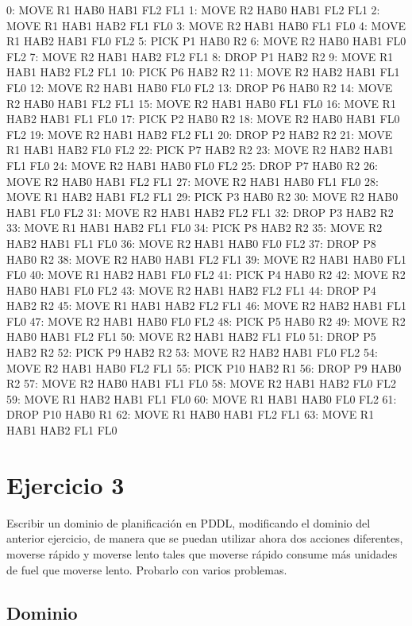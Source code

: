 \documentclass[	DIV=calc,%
							paper=a4,%
							fontsize=11pt]{scrartcl}	 					%
\newcommand{\miit}[1]{{\usefont{T1}{mdugm}{m}{it}\selectfont #1}}
\begin{document}
\begin{bashcode}
0: MOVE R1 HAB0 HAB1 FL2 FL1
1: MOVE R2 HAB0 HAB1 FL2 FL1
2: MOVE R1 HAB1 HAB2 FL1 FL0
3: MOVE R2 HAB1 HAB0 FL1 FL0
4: MOVE R1 HAB2 HAB1 FL0 FL2
5: PICK P1 HAB0 R2
6: MOVE R2 HAB0 HAB1 FL0 FL2
7: MOVE R2 HAB1 HAB2 FL2 FL1
8: DROP P1 HAB2 R2
9: MOVE R1 HAB1 HAB2 FL2 FL1
10: PICK P6 HAB2 R2
11: MOVE R2 HAB2 HAB1 FL1 FL0
12: MOVE R2 HAB1 HAB0 FL0 FL2
13: DROP P6 HAB0 R2
14: MOVE R2 HAB0 HAB1 FL2 FL1
15: MOVE R2 HAB1 HAB0 FL1 FL0
16: MOVE R1 HAB2 HAB1 FL1 FL0
17: PICK P2 HAB0 R2
18: MOVE R2 HAB0 HAB1 FL0 FL2
19: MOVE R2 HAB1 HAB2 FL2 FL1
20: DROP P2 HAB2 R2
21: MOVE R1 HAB1 HAB2 FL0 FL2
22: PICK P7 HAB2 R2
23: MOVE R2 HAB2 HAB1 FL1 FL0
24: MOVE R2 HAB1 HAB0 FL0 FL2
25: DROP P7 HAB0 R2
26: MOVE R2 HAB0 HAB1 FL2 FL1
27: MOVE R2 HAB1 HAB0 FL1 FL0
28: MOVE R1 HAB2 HAB1 FL2 FL1
29: PICK P3 HAB0 R2
30: MOVE R2 HAB0 HAB1 FL0 FL2
31: MOVE R2 HAB1 HAB2 FL2 FL1
32: DROP P3 HAB2 R2
33: MOVE R1 HAB1 HAB2 FL1 FL0
34: PICK P8 HAB2 R2
35: MOVE R2 HAB2 HAB1 FL1 FL0
36: MOVE R2 HAB1 HAB0 FL0 FL2
37: DROP P8 HAB0 R2
38: MOVE R2 HAB0 HAB1 FL2 FL1
39: MOVE R2 HAB1 HAB0 FL1 FL0
40: MOVE R1 HAB2 HAB1 FL0 FL2
41: PICK P4 HAB0 R2
42: MOVE R2 HAB0 HAB1 FL0 FL2
43: MOVE R2 HAB1 HAB2 FL2 FL1
44: DROP P4 HAB2 R2
45: MOVE R1 HAB1 HAB2 FL2 FL1
46: MOVE R2 HAB2 HAB1 FL1 FL0
47: MOVE R2 HAB1 HAB0 FL0 FL2
48: PICK P5 HAB0 R2
49: MOVE R2 HAB0 HAB1 FL2 FL1
50: MOVE R2 HAB1 HAB2 FL1 FL0
51: DROP P5 HAB2 R2
52: PICK P9 HAB2 R2
53: MOVE R2 HAB2 HAB1 FL0 FL2
54: MOVE R2 HAB1 HAB0 FL2 FL1
55: PICK P10 HAB2 R1
56: DROP P9 HAB0 R2
57: MOVE R2 HAB0 HAB1 FL1 FL0
58: MOVE R2 HAB1 HAB2 FL0 FL2
59: MOVE R1 HAB2 HAB1 FL1 FL0
60: MOVE R1 HAB1 HAB0 FL0 FL2
61: DROP P10 HAB0 R1
62: MOVE R1 HAB0 HAB1 FL2 FL1
63: MOVE R1 HAB1 HAB2 FL1 FL0
\end{bashcode}

\section{Ejercicio 3}
\label{sec:Ejercicio 3}

\miit{Escribir un dominio de planificación en PDDL, modificando el dominio del anterior
ejercicio, de manera que se puedan utilizar ahora dos acciones diferentes, moverse
rápido y moverse lento tales que moverse rápido consume más unidades de fuel que
moverse lento. Probarlo con varios problemas.}

\subsection{Dominio}
\label{sub:Dominio}
\end{document}
